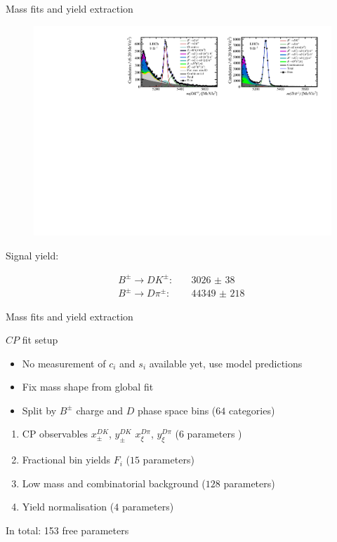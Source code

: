 \documentclass{beamer}
\begin{document}
\begin{frame}{Mass fits and yield extraction}
  \begin{figure}
    \centering
    \includegraphics[width = 1.0\textwidth]{Plots/d2kkpipi_fiveL_allDP.pdf}
  \end{figure}
  \begin{center}
    Signal yield:
  \end{center}
  \vspace{-0.3cm}
  \begin{align*}
    B^\pm\to DK^\pm:&\quad \SI{3026(38)}{} \\
    B^\pm\to D\pi^\pm:&\quad \SI{44349(218)}{}
  \end{align*}
\end{frame}

\begin{frame}{Mass fits and yield extraction}
  \begin{center}
    \Large $C\!P$ fit setup
  \end{center}
  \begin{itemize}
    \setlength\itemsep{0.5em}
    \item{No measurement of $c_i$ and $s_i$ available yet, use model predictions}
    \item{Fix mass shape from global fit}
    \item{Split by $B^\pm$ charge and $D$ phase space bins ($64$ categories)}
  \end{itemize}
  \vspace{0.3cm}
  \begin{enumerate}
    \setlength\itemsep{0.5em}
    \item{CP observables $x_\pm^{DK}$, $y_\pm^{DK}$ $x_\xi^{D\pi}$, $y_\xi^{D\pi}$ ($6$ parameters
)}
    \item{Fractional bin yields $F_i$ ($15$ parameters)}
    \item{Low mass and combinatorial background ($128$ parameters)}
    \item{Yield normalisation ($4$ parameters)}
  \end{enumerate}
  In total: 153 free parameters
\end{frame}
\end{document}
